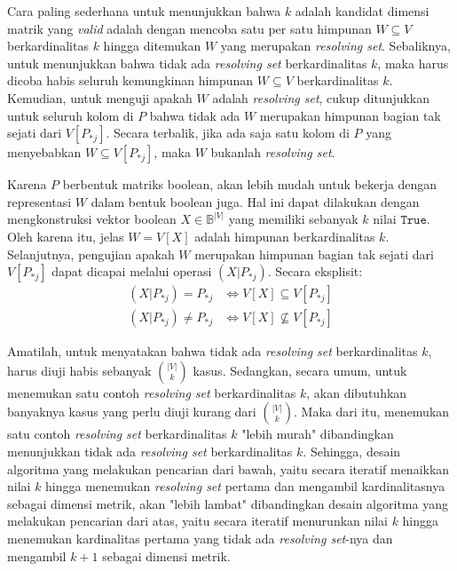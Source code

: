 \documentclass[10pt,twocolumn]{article}
\newcommand{\foreign}[1]{\foreignlanguage{english}{\textit{#1}}}
\def\True{\mathtt{True}}
\def\Bbb{\mathbb{B}}
\begin{document}
Cara paling sederhana untuk menunjukkan bahwa \(k\) adalah kandidat dimensi matrik yang \foreign{valid} adalah dengan mencoba satu per satu himpunan \(W \subseteq V\) berkardinalitas \(k\) hingga ditemukan \(W\) yang merupakan \foreign{resolving set}. Sebaliknya, untuk menunjukkan bahwa tidak ada \foreign{resolving set} berkardinalitas \(k\), maka harus dicoba habis seluruh kemungkinan himpunan \(W \subseteq V\) berkardinalitas \(k\). Kemudian, untuk menguji apakah \(W\) adalah \foreign{resolving set}, cukup ditunjukkan untuk seluruh kolom di \(P\) bahwa tidak ada \(W\) merupakan himpunan bagian tak sejati dari \(V[P_{*j}]\). Secara terbalik, jika ada saja satu kolom di \(P\) yang menyebabkan \(W \subseteq V[P_{*j}]\), maka \(W\) bukanlah \foreign{resolving set}.

Karena \(P\) berbentuk matriks boolean, akan lebih mudah untuk bekerja dengan representasi \(W\) dalam bentuk boolean juga. Hal ini dapat dilakukan dengan mengkonstruksi vektor boolean \(X \in \Bbb^{|V|}\) yang memiliki sebanyak \(k\) nilai \(\True\). Oleh karena itu, jelas \(W = V[X]\) adalah himpunan berkardinalitas \(k\). Selanjutnya, pengujian apakah \(W\) merupakan himpunan bagian tak sejati dari \(V[P_{*j}]\) dapat dicapai melalui operasi \((X|P_{*j})\). Secara eksplisit:
\[
	\begin{array}{rl}
		(X|P_{*j}) = P_{*j}  &\iff V[X] \subseteq V[P_{*j}] \\
		(X|P_{*j}) \neq P_{*j}  &\iff V[X] \not\subseteq V[P_{*j}]
	\end{array}
\]

Amatilah, untuk menyatakan bahwa tidak ada \foreign{resolving set} berkardinalitas \(k\), harus diuji habis sebanyak \(\binom{|V|}{k}\) kasus. Sedangkan, secara umum, untuk menemukan satu contoh \foreign{resolving set} berkardinalitas \(k\), akan dibutuhkan banyaknya kasus yang perlu diuji kurang dari \(\binom{|V|}{k}\). Maka dari itu, menemukan satu contoh \foreign{resolving set} berkardinalitas \(k\) "lebih murah" dibandingkan menunjukkan tidak ada \foreign{resolving set} berkardinalitas \(k\). Sehingga, desain algoritma yang melakukan pencarian dari bawah, yaitu secara iteratif menaikkan nilai \(k\) hingga menemukan \foreign{resolving set} pertama dan mengambil kardinalitasnya sebagai dimensi metrik, akan "lebih lambat" dibandingkan desain algoritma yang melakukan pencarian dari atas, yaitu secara iteratif menurunkan nilai \(k\) hingga menemukan kardinalitas pertama yang tidak ada \foreign{resolving set}-nya dan mengambil \(k + 1\) sebagai dimensi metrik.
\end{document}
